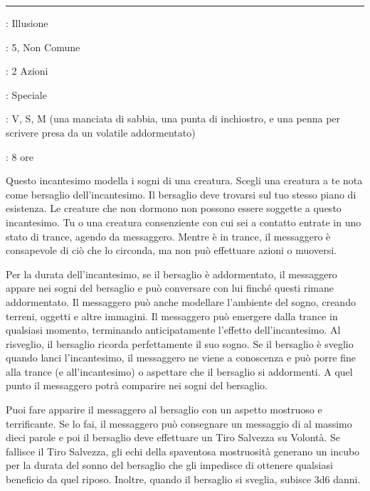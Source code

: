 \begin{multicols}{2}
\smallskip\noindent\rule{\linewidth}{2pt} \hypertarget{Sogno}{}\smallskip{}
\noindent
\begin{description}[noitemsep, topsep=0pt, parsep=0pt, partopsep=0pt, leftmargin=0cm, labelwidth=2.8cm]
	\item[\textbf{Lista di Magia}]: Illusione
	\item[\textbf{Livello}]: 5, Non Comune
	\item[\textbf{T. di Lancio}]: 2 Azioni
	\item[\textbf{Gittata}]: Speciale
	\item[\textbf{Componenti}]: V, S, M (una manciata di sabbia, una punta di inchiostro, e una penna per scrivere presa da un volatile addormentato)
	\item[\textbf{Durata}]: 8 ore
\end{description}

Questo incantesimo modella i sogni di una creatura. Scegli una creatura a te nota come bersaglio dell'incantesimo. Il bersaglio deve trovarsi sul tuo stesso piano di esistenza. Le creature che non dormono non possono essere soggette a questo incantesimo. Tu o una creatura consenziente con cui sei a contatto entrate in uno stato di trance, agendo da messaggero. Mentre è in trance, il messaggero è consapevole di ciò che lo circonda, ma non può effettuare azioni o muoversi.

Per la durata dell'incantesimo, se il bersaglio è addormentato, il messaggero appare nei sogni del bersaglio e può conversare con lui finché questi rimane addormentato. Il messaggero può anche modellare l'ambiente del sogno, creando terreni, oggetti e altre immagini. Il messaggero può emergere dalla trance in qualsiasi momento, terminando anticipatamente l'effetto dell'incantesimo. Al risveglio, il bersaglio ricorda perfettamente il suo sogno. Se il bersaglio è sveglio quando lanci l'incantesimo, il messaggero ne viene a conoscenza e può porre fine alla trance (e all'incantesimo) o aspettare che il bersaglio si addormenti. A quel punto il messaggero potrà comparire nei sogni del bersaglio.

Puoi fare apparire il messaggero al bersaglio con un aspetto mostruoso e terrificante. Se lo fai, il messaggero può consegnare un messaggio di al massimo dieci parole e poi il bersaglio deve effettuare un Tiro Salvezza su Volontà. Se fallisce il Tiro Salvezza, gli echi della spaventosa mostruosità generano un incubo per la durata del sonno del bersaglio che gli impedisce di ottenere qualsiasi beneficio da quel riposo. Inoltre, quando il bersaglio si sveglia, subisce 3d6 danni.


\end{multicols}

